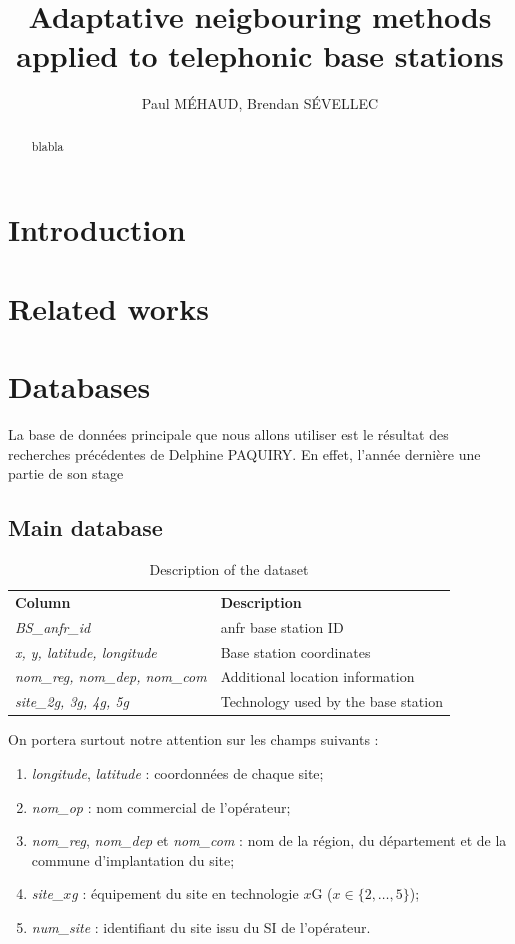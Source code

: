 \documentclass[lettersize,journal]{IEEEtran}
\title{Adaptative neigbouring methods applied to telephonic base stations}
\author{Paul MÉHAUD, Brendan SÉVELLEC}
\begin{document}
\maketitle

\begin{abstract}
  blabla
\end{abstract}

\section{Introduction}

\section{Related works}

\section{Databases}
La base de données principale que nous allons utiliser est le résultat des recherches précédentes de Delphine PAQUIRY.
En effet, l'année dernière une partie de son stage 

\subsection{Main database}

\cite{main_database}

\begin{table}[!b]
    \centering
    \caption{Description of the dataset}
    \label{data_columns}
    \begin{tabular}{ll}
        \toprule
        \textbf{Column} & \textbf{Description} \\
        \cmidrule(lr){1-2}
        \textsl{BS\_anfr\_id} & \acrshort{anfr} base station ID \\ 
        \textsl{x, y, latitude, longitude} & Base station coordinates \\ 
        \textsl{nom\_reg, nom\_dep, nom\_com} & Additional location information \\  
        \textsl{site\_2g, 3g, 4g, 5g} & Technology used by the base station \\ 
        \bottomrule
    \end{tabular}
\end{table}


On portera surtout notre attention sur les champs suivants :
\begin{enumerate}
    \item \textsl{longitude}, \textsl{latitude} : coordonnées de chaque site;
    \item \textsl{nom\_op} : nom commercial de l'opérateur;
    \item \textsl{nom\_reg}, \textsl{nom\_dep} et \textsl{nom\_com} : nom de la région, du département et de la commune d'implantation du site;
    \item \textsl{site\_$x$g} : équipement du site en technologie $x$G ($x\in\{ 2,\dots,5\}$);
    \item \textsl{num\_site} : identifiant du site issu du SI de l'opérateur. 
\end{enumerate}
\end{document}
